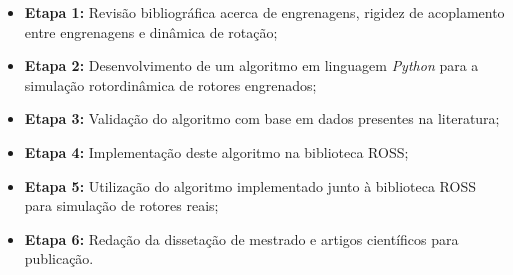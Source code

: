 \begin{itemize}
	\item \textbf{Etapa 1:} Revisão bibliográfica acerca de engrenagens, rigidez de acoplamento entre engrenagens e dinâmica de rotação;
	\item \textbf{Etapa 2:}  Desenvolvimento de um algoritmo em linguagem \textit{Python} para a simulação rotordinâmica de rotores engrenados;
	\item \textbf{Etapa 3:} Validação do algoritmo com base em dados presentes na literatura;
	\item \textbf{Etapa 4:} Implementação deste algoritmo na biblioteca ROSS;
	\item \textbf{Etapa 5:} Utilização do algoritmo implementado junto à biblioteca ROSS para simulação de rotores reais;
	\item \textbf{Etapa 6:} Redação da dissetação de mestrado e artigos científicos para publicação.
\end{itemize}


